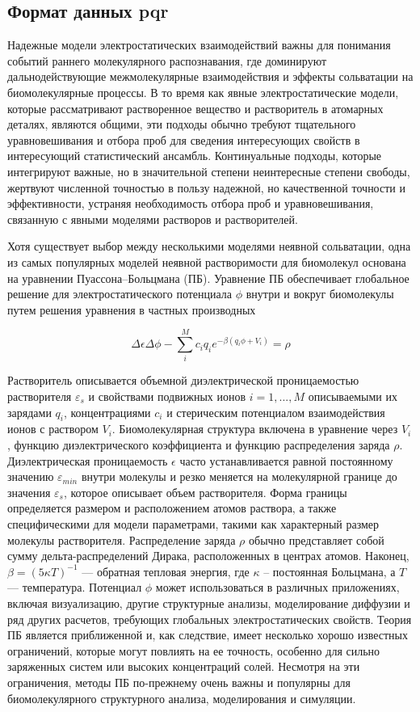 \subsection{Формат данных pqr}

Надежные модели электростатических взаимодействий важны для понимания событий раннего молекулярного распознавания, где доминируют дальнодействующие межмолекулярные взаимодействия и эффекты сольватации на биомолекулярные процессы. В то время как явные электростатические модели, которые рассматривают растворенное вещество и растворитель в атомарных деталях, являются общими, эти подходы обычно требуют тщательного уравновешивания и отбора проб для сведения интересующих свойств в интересующий статистический ансамбль. Континуальные подходы, которые интегрируют важные, но в значительной степени неинтересные степени свободы, жертвуют численной точностью в пользу надежной, но качественной точности и эффективности, устраняя необходимость отбора проб и уравновешивания, связанную с явными моделями растворов и растворителей.

Хотя существует выбор между несколькими моделями неявной сольватации, одна из самых популярных моделей неявной растворимости для биомолекул основана на уравнении Пуассона–Больцмана (ПБ). Уравнение ПБ обеспечивает глобальное решение для электростатического потенциала $\phi$ внутри и вокруг биомолекулы путем решения уравнения в частных производных

\begin{equation}
	\Delta \epsilon \Delta \phi - \sum_i^M c_i q_i e^{-\beta(q_i \phi + V_i)} = \rho
	\label{pde}
\end{equation}

Растворитель описывается объемной диэлектрической проницаемостью растворителя $\varepsilon_s$ и свойствами подвижных ионов $i = 1, ..., M$ описываемыми их зарядами $q_i$, концентрациями $c_i$ и стерическим потенциалом взаимодействия ионов с раствором $V_i$. Биомолекулярная структура включена в уравнение через $V_i$, функцию диэлектрического коэффициента и функцию распределения заряда $\rho$. Диэлектрическая проницаемость $\epsilon$ часто устанавливается равной постоянному значению $\varepsilon_{min}$ внутри молекулы и резко меняется на молекулярной границе до значения $\varepsilon_s$, которое описывает объем растворителя. Форма границы определяется размером и расположением атомов раствора, а также специфическими для модели параметрами, такими как характерный размер молекулы растворителя. Распределение заряда $\rho$ обычно представляет собой сумму дельта-распределений Дирака, расположенных в центрах атомов. Наконец, $\beta = {(5 \kappa T)}^{-1}$ — обратная тепловая энергия, где $\kappa$ -- постоянная Больцмана, а $T$ — температура. Потенциал $\phi$ может использоваться в различных приложениях, включая визуализацию, другие структурные анализы, моделирование диффузии и ряд других расчетов, требующих глобальных электростатических свойств. Теория ПБ является приближенной и, как следствие, имеет несколько хорошо известных ограничений, которые могут повлиять на ее точность, особенно для сильно заряженных систем или высоких концентраций солей. Несмотря на эти ограничения, методы ПБ по-прежнему очень важны и популярны для биомолекулярного структурного анализа, моделирования и симуляции.


